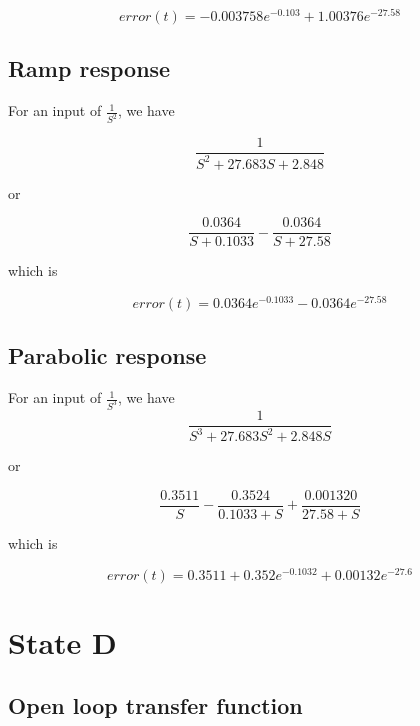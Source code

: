 \begin{equation}
error(t) =  -0.003758 e^{-0.103} + 1.00376 e^{-27.58}
\end{equation}


\subsection{Ramp response}

For an input of $\frac{1}{S^2}$, we have 

\begin{equation}
\frac{1}{S^2 + 27.683 S + 2.848}
\end{equation}

or 

\begin{equation}
\frac{0.0364}{S+0.1033} -\frac{0.0364}{S+27.58}
\end{equation}

which is 

\begin{equation}
error(t) =  0.0364e^{-0.1033} - 0.0364e^{-27.58}
\end{equation}


\subsection{Parabolic response}

For an input of $\frac{1}{S^3}$, we have 
\begin{equation}
\frac{1}{S^3 +27.683 S^2 + 2.848 S}
\end{equation}


or 

\begin{equation}
\frac{0.3511}{S}-\frac{0.3524}{0.1033+S}
+\frac{0.001320}{27.58+S}
\end{equation}

which is

\begin{equation}
error(t) = 0.3511 + 0.352 e^{-0.1032} + 0.00132 e^{-27.6}
\end{equation}

\section{State D}




\subsection{Open loop transfer function}
\begin{comment}
(18, 1)
(1, array([ 0.        ,  0.01131368,  0.00022784]))
(18, 1)
(2, array([ 55.06692161,   4.63278117,   0.77306969]))
\end{comment}


